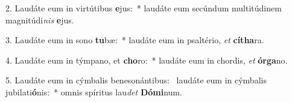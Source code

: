2. Laudáte eum in virtútibus \textbf{e}jus:~*  laudáte eum secúndum multitúdinem magnitúdi\textit{nis} \textbf{e}jus.\

3. Laudáte eum in sono \textbf{tu}bæ:~*  laudáte eum in psaltério, \textit{et} \textbf{cí}\textbf{tha}ra.\

4. Laudáte eum in týmpano, et \textbf{cho}ro:~*  laudáte eum in chordis, \textit{et} \textbf{ór}\textbf{ga}no.\

5. Laudáte eum in cýmbalis benesonántibus: \dag\  laudáte eum in cýmbalis jubilati\textbf{ó}nis:~*  omnis spíritus lau\textit{det} \textbf{Dó}\textbf{mi}num.\


